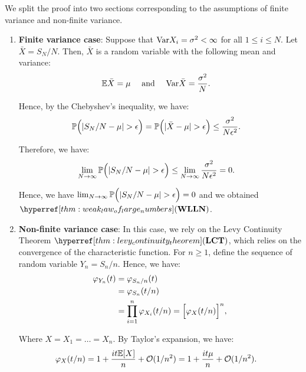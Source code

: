 \begin{proof*}
    We split the proof into two sections corresponding to the assumptions of finite variance and non-finite variance.
    \begin{enumerate}
        \item \textbf{Finite variance case}:
        Suppose that $\mathrm{Var} X_i = \sigma^2<\infty$ for all $1\le i \le N$. Let $\bar X = S_N/N$. Then, $\bar X$ is a random variable with the following mean and variance:
        \begin{align*}
            \mathbb{E}\bar X &= \mu \quad \text{ and } \quad \mathrm{Var} \bar X = \frac{\sigma^2}{N}.
        \end{align*}

        \noindent Hence, by the Chebyshev's inequality, we have:
        \begin{align*}
            \mathbb{P}\Big( |S_N/N - \mu| > \epsilon \Big) &= \mathbb{P}\Big( |\bar X - \mu| > \epsilon \Big) \le \frac{\sigma^2}{N\epsilon^2}.
        \end{align*}

        \noindent Therefore, we have:
        \begin{align*}
            \lim_{N\to\infty}\mathbb{P}\Big( |S_N/N - \mu| > \epsilon \Big) &\le \lim_{N\to\infty}\frac{\sigma^2}{N\epsilon^2} = 0.
        \end{align*}

        \noindent Hence, we have $\lim_{N\to\infty}\mathbb{P}\Big( |S_N/N - \mu| > \epsilon \Big)=0$ and we obtained $\WLLN$.

        \item \textbf{Non-finite variance case}: In this case, we rely on the Levy Continuity Theorem $\LCT$, which relies on the convergence of the characteristic function. For $n\ge1$, define the sequence of random variable $Y_n=S_n/n$. Hence, we have:
        \begin{align*}
            \varphi_{Y_n}(t) &= \varphi_{S_n/n}(t) \\
                &= \varphi_{S_n}(t/n) \\
                &= \prod_{i=1}^n \varphi_{X_i}(t/n) = \Big[ \varphi_X(t/n) \Big]^n,
        \end{align*}

        \noindent Where $X=X_1=\dots=X_n$. By Taylor's expansion, we have:
        \begin{align*}
            \varphi_X(t/n) &= 1 + \frac{it\mathbb{E}[X]}{n} + \mathcal{O}(1/n^2) = 1 +\frac{it\mu}{n} + \mathcal{O}(1/n^2).
        \end{align*}


\end{enumerate}
\end{proof*}
